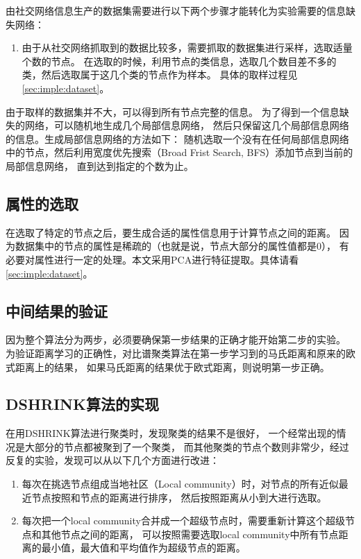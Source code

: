 由社交网络信息生产的数据集需要进行以下两个步骤才能转化为实验需要的信息缺失网络：

\begin{enumerate}
\item 由于从社交网络抓取到的数据比较多，需要抓取的数据集进行采样，选取适量个数的节点。
在选取的时候，利用节点的类信息，选取几个数目差不多的类，然后选取属于这几个类的节点作为样本。
具体的取样过程见\ref{sec:imple:dataset}。
\end{enumerate}
\item 由于取样的数据集并不大，可以得到所有节点完整的信息。
为了得到一个信息缺失的网络，可以随机地生成几个局部信息网络，
然后只保留这几个局部信息网络的信息。生成局部信息网络的方法如下：
随机选取一个没有在任何局部信息网络中的节点，然后利用宽度优先搜索（Broad Frist Search, BFS）添加节点到当前的局部信息网络，
直到达到指定的个数为止。

\subsection{属性的选取}

在选取了特定的节点之后，要生成合适的属性信息用于计算节点之间的距离。
因为数据集中的节点的属性是稀疏的（也就是说，节点大部分的属性值都是0），
有必要对属性进行一定的处理。本文采用PCA进行特征提取。具体请看\ref{sec:imple:dataset}。

\subsection{中间结果的验证}

因为整个算法分为两步，必须要确保第一步结果的正确才能开始第二步的实验。
为验证距离学习的正确性，对比谱聚类算法在第一步学习到的马氏距离和原来的欧式距离上的结果，
如果马氏距离的结果优于欧式距离，则说明第一步正确。

\subsection{DSHRINK算法的实现}

在用DSHRINK算法进行聚类时，发现聚类的结果不是很好，
一个经常出现的情况是大部分的节点都被聚到了一个聚类，
而其他聚类的节点个数则非常少，经过反复的实验，发现可以从以下几个方面进行改进：

\begin{enumerate}
\item 每次在挑选节点组成当地社区（Local community）时，对节点的所有近似最近节点按照和节点的距离进行排序，
然后按照距离从小到大进行选取。
\item 每次把一个local community合并成一个超级节点时，需要重新计算这个超级节点和其他节点之间的距离，
可以按照需要选取local community中所有节点距离的最小值，最大值和平均值作为超级节点的距离。
\end{enumerate}


